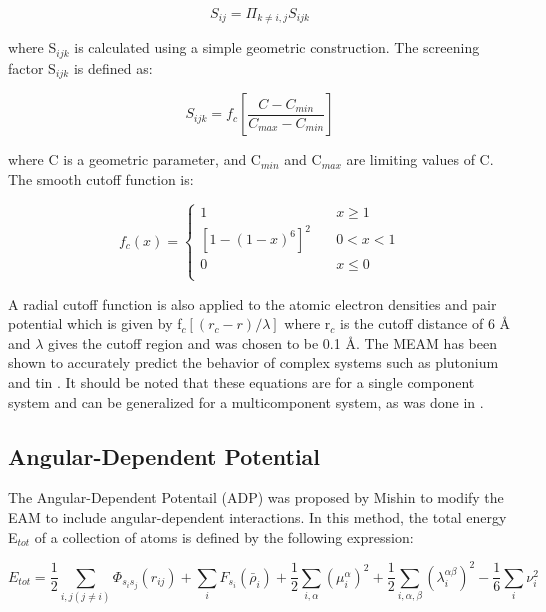 \documentclass[review]{elsarticle}
\begin{document}
\begin{equation}
\label{eq:eqn14}
S_{ij}=\Pi_{k \neq i,j}S_{ijk}
\end{equation}

where S$_{ijk}$ is calculated using a simple geometric construction.  The screening factor S$_{ijk}$ is defined as:

\begin{equation}
\label{eq:eqn15}
S_{ijk}= f_{c}\left[\frac{C-C_{min}}{C_{max}-C_{min}}\right]
\end{equation}

where C is a geometric parameter, and C$_{min}$ and C$_{max}$ are limiting values of C.  The smooth cutoff function is:

\begin{equation}
\label{eq:eqn16}
f_{c}(x) = \begin{cases}
    1       & \quad x \geq 1 \\
    [1-(1-x)^{6}]^{2}  & \quad 0 < x < 1\\
    0       & \quad x \leq 0\\
  \end{cases} 
\end{equation}

A radial cutoff function is also applied to the atomic electron densities and pair potential which is given by f$_{c}[(r_{c}-r)/\lambda]$ where r$_{c}$ is the cutoff distance of 6 {\AA } and $\lambda$ gives the cutoff region and was chosen to be 0.1 {\AA}.  The MEAM has been shown to accurately predict the behavior of complex systems such as plutonium \cite{baskes2000} and tin \cite{baskes1997}.  It should be noted that these equations are for a single component system and can be generalized for a multicomponent system, as was done in \cite{baskes2014}.  

\subsection{Angular-Dependent Potential}

The Angular-Dependent Potentail (ADP) was proposed by Mishin \cite{mishin2005} to modify the EAM to include angular-dependent interactions. In this method, the total energy E$_{tot}$ of a collection of atoms is defined by the following expression:

\begin{equation}
\label{eq:eqn17}
E_{tot} = \frac{1}{2}\sum_{i,j(j\neq i)}\Phi_{s_{i}s_{j}}(r_{ij}) + \sum_{i} F_{s_{i}}(\bar{\rho}_{i}) + \frac{1}{2}\sum_{i,\alpha}(\mu_{i}^{\alpha})^2 + \frac{1}{2}\sum_{i,\alpha,\beta}(\lambda_{i}^{\alpha \beta})^2 - \frac{1}{6}\sum_{i}\nu_{i}^2
\end{equation}
\end{document}

